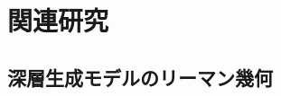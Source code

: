 \documentclass[MIRU,submit]{miru2026j}
\theoremstyle{definition}
\begin{document}





\section{関連研究}

\subsection{深層生成モデルのリーマン幾何}
\end{document}
